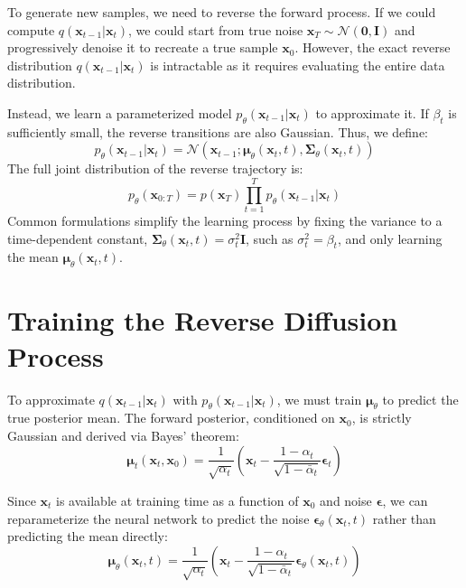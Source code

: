 To generate new samples, we need to reverse the forward process. If we could compute $q(\mathbf{x}_{t-1} | \mathbf{x}_t)$, we could start from true noise $\mathbf{x}_T \sim \mathcal{N}(\mathbf{0}, \mathbf{I})$ and progressively denoise it to recreate a true sample $\mathbf{x}_0$. However, the exact reverse distribution $q(\mathbf{x}_{t-1} | \mathbf{x}_t)$ is intractable as it requires evaluating the entire data distribution. 

Instead, we learn a parameterized model $p_\theta(\mathbf{x}_{t-1} | \mathbf{x}_t)$ to approximate it. If $\beta_t$ is sufficiently small, the reverse transitions are also Gaussian. Thus, we define:
\begin{equation}
    p_\theta(\mathbf{x}_{t-1} | \mathbf{x}_t) = \mathcal{N}(\mathbf{x}_{t-1}; \boldsymbol{\mu}_\theta(\mathbf{x}_t, t), \mathbf{\Sigma}_\theta(\mathbf{x}_t, t))
\end{equation}
The full joint distribution of the reverse trajectory is:
\begin{equation}
    p_\theta(\mathbf{x}_{0:T}) = p(\mathbf{x}_T) \prod_{t=1}^T p_\theta(\mathbf{x}_{t-1} | \mathbf{x}_t)
\end{equation}
Common formulations simplify the learning process by fixing the variance to a time-dependent constant, $\mathbf{\Sigma}_\theta(\mathbf{x}_t, t) = \sigma_t^2 \mathbf{I}$, such as $\sigma_t^2 = \beta_t$, and only learning the mean $\boldsymbol{\mu}_\theta(\mathbf{x}_t, t)$.

\section{Training the Reverse Diffusion Process}

To approximate $q(\mathbf{x}_{t-1} | \mathbf{x}_t)$ with $p_\theta(\mathbf{x}_{t-1} | \mathbf{x}_t)$, we must train $\boldsymbol{\mu}_\theta$ to predict the true posterior mean. The forward posterior, conditioned on $\mathbf{x}_0$, is strictly Gaussian and derived via Bayes' theorem:
\begin{equation}
    \boldsymbol{\mu}_t(\mathbf{x}_t, \mathbf{x}_0) = \frac{1}{\sqrt{\alpha_t}} \left( \mathbf{x}_t - \frac{1 - \alpha_t}{\sqrt{1 - \bar{\alpha}_t}} \boldsymbol{\epsilon}_t \right)
\end{equation}

Since $\mathbf{x}_t$ is available at training time as a function of $\mathbf{x}_0$ and noise $\boldsymbol{\epsilon}$, we can reparameterize the neural network to predict the noise $\boldsymbol{\epsilon}_\theta(\mathbf{x}_t, t)$ rather than predicting the mean directly:
\begin{equation}
    \boldsymbol{\mu}_\theta(\mathbf{x}_t, t) = \frac{1}{\sqrt{\alpha_t}} \left( \mathbf{x}_t - \frac{1 - \alpha_t}{\sqrt{1 - \bar{\alpha}_t}} \boldsymbol{\epsilon}_\theta(\mathbf{x}_t, t) \right)
\end{equation}

